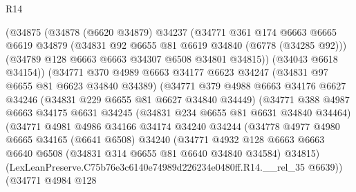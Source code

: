 \begin{lexlean}{R14}
\begin{coremodule}
                    (@34875
                      (@34878
                        (@6620 @34879)
                        @34237
                        (@34771
                          @361
                          @174
                          @6663
                          @6665
                          @6619
                          @34879
                          (@34831 @92 @6655 @81 @6619 @34840 (@6778 (@34285 @92)))
                          (@34789 @128 @6663 @6663 @34307 @6508 @34801 @34815))
                        (@34043 @6618 @34154))
                      (@34771
                        @370
                        @4989
                        @6663
                        @34177
                        @6623
                        @34247
                        (@34831 @97 @6655 @81 @6623 @34840 @34389)
                        (@34771
                          @379
                          @4988
                          @6663
                          @34176
                          @6627
                          @34246
                          (@34831 @229 @6655 @81 @6627 @34840 @34449)
                          (@34771
                            @388
                            @4987
                            @6663
                            @34175
                            @6631
                            @34245
                            (@34831 @234 @6655 @81 @6631 @34840 @34464)
                            (@34771
                              @4981
                              @4986
                              @34166
                              @34174
                              @34240
                              @34244
                              (@34778
                                @4977
                                @4980
                                @6665
                                @34165
                                (@6641 @6508)
                                @34240
                                (@34771
                                  @4932
                                  @128
                                  @6663
                                  @6663
                                  @6640
                                  @6508
                                  (@34831 @314 @6655 @81 @6640 @34840 @34584)
                                  @34815)
                                (LexLeanPreserve.C75b76e3c6140e74989d226234e0480ff.R14.__rel_35
                                  @6639))
                              (@34771
                                @4984
                                @128

\end{coremodule}
\end{lexlean}
